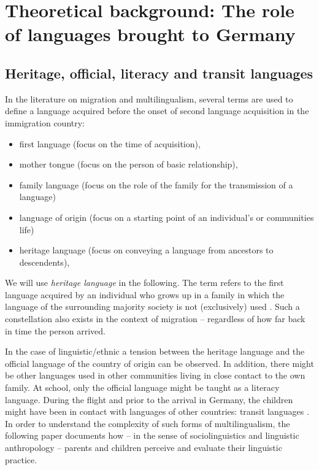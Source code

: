 \documentclass[output=paper,colorlinks,citecolor=brown]{langscibook}
\begin{document}
\section{Theoretical background: The role of languages brought to Germany}\label{ch2.5.ss.2}

\subsection{Heritage, official, literacy and transit languages}\label{ch2.5.ss.2.1}

In the literature on migration and multilingualism, several terms are used to define a language acquired before the onset of second language acquisition in the immigration country:
\newpage
\begin{itemize}
    \item first language (focus on the time of acquisition), 
    \item mother tongue (focus on the person of basic relationship), 
    \item family language (focus on the role of the family for the transmission of a language) 
    \item language of origin (focus on a starting point of an individual's or communities life)
    \item heritage language (focus on conveying a language from ancestors to descendents), 
\end{itemize}
    
We will use \textit{heritage language} in the following. The term refers to the first language acquired by an individual who grows up in a family in which the language of the surrounding majority society is not (exclusively) used \citep[131]{polinsky2018}. Such a constellation also exists in the context of migration -- regardless of how far back in time the person arrived. 

In the case of linguistic/ethnic  a tension between the heritage language and the official language of the country of origin can be observed. In addition, there might be other languages used in other communities living in close contact to the own family. At school, only the official language might be taught as a literacy language. During the flight and prior to the arrival in Germany, the children might have been in contact with languages of other countries: transit languages \citep{le_pichon-vorstmann2020}. In order to understand the complexity of such forms of multilingualism, the following paper documents how -- in the sense of sociolinguistics and linguistic anthropology -- parents and children perceive and evaluate their linguistic practice. 
\end{document}
